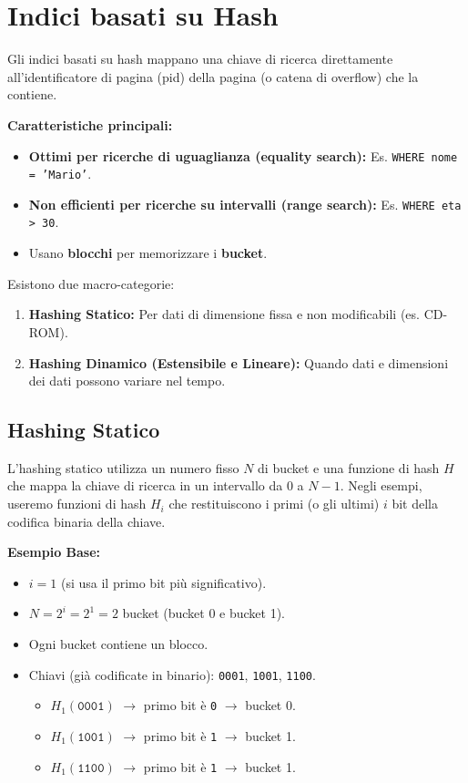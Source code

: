 \section{Indici basati su Hash}

Gli indici basati su hash mappano una chiave di ricerca direttamente all'identificatore di pagina (pid) della pagina (o catena di overflow) che la contiene.

\textbf{Caratteristiche principali:}
\begin{itemize}
    \item \textbf{Ottimi per ricerche di uguaglianza (equality search):} Es. \texttt{WHERE nome = 'Mario'}.
    \item \textbf{Non efficienti per ricerche su intervalli (range search):} Es. \texttt{WHERE eta > 30}.
    \item Usano \textbf{blocchi} per memorizzare i \textbf{bucket}.
\end{itemize}

Esistono due macro-categorie:
\begin{enumerate}
    \item \textbf{Hashing Statico:} Per dati di dimensione fissa e non modificabili (es. CD-ROM).
    \item \textbf{Hashing Dinamico (Estensibile e Lineare):} Quando dati e dimensioni dei dati possono variare nel tempo.
\end{enumerate}

\subsection{Hashing Statico}

L'hashing statico utilizza un numero fisso $N$ di bucket e una funzione di hash $H$ che mappa la chiave di ricerca in un intervallo da 0 a $N-1$.
Negli esempi, useremo funzioni di hash $H_i$ che restituiscono i primi (o gli ultimi) $i$ bit della codifica binaria della chiave.

\textbf{Esempio Base:}
\begin{itemize}
    \item $i = 1$ (si usa il primo bit più significativo).
    \item $N = 2^i = 2^1 = 2$ bucket (bucket 0 e bucket 1).
    \item Ogni bucket contiene un blocco.
    \item Chiavi (già codificate in binario): \texttt{0001}, \texttt{1001}, \texttt{1100}.
    \begin{itemize}
        \item $H_1(\texttt{0001})$ $\rightarrow$ primo bit è \texttt{0} $\rightarrow$ bucket 0.
        \item $H_1(\texttt{1001})$ $\rightarrow$ primo bit è \texttt{1} $\rightarrow$ bucket 1.
        \item $H_1(\texttt{1100})$ $\rightarrow$ primo bit è \texttt{1} $\rightarrow$ bucket 1.
    \end{itemize}
\end{itemize}

